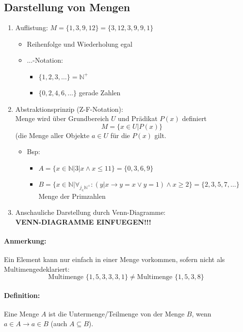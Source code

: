 \subsection{Darstellung von Mengen}
\begin{enumerate}
\item Auflistung: $M=\{1,3,9,12\}=\{3,12,3,9,9,1\}$
\begin{itemize}
\item Reihenfolge und Wiederholung egal
\item \glq $\ldots$\grq -Notation:
\begin{itemize}
\item $\{1,2,3,\ldots\}=\mathbb{N}^+$
\item $\{0,2,4,6,\ldots\}$ gerade Zahlen
\end{itemize}
\end{itemize}
\item Abstraktionsprinzip (Z-F-Notation):\\
Menge wird über Grundbereich $U$ und Prädikat $P(x)$ definiert
\[
M=\{x\in U | P(x)\}
\]
(die Menge aller Objekte $a\in U$ für die $P(x)$ gilt.
\begin{itemize}
\item Bsp:
\begin{itemize}
\item $A=\{x\in\mathbb{N}|3|x \land x\leq 11\} = \{0,3,6,9\}$
\item $B=\{x\in\mathbb{N}|\forall_{j_\in\mathbb{N}^+}:(y|x\rightarrow y=x \lor y=1)\land x\geq 2\}=\{2,3,5,7,\ldots \}$ Menge der Primzahlen
\end{itemize}
\end{itemize}
\item Anschauliche Darstellung durch Venn-Diagramme:\\
\textbf{VENN-DIAGRAMME EINFUEGEN!!!}
\end{enumerate}

\paragraph{Anmerkung:} Ein Element kann nur einfach in einer Menge vorkommen, sofern nicht als \glqq Multimenge\grqq deklariert:
\[
\text{Multimenge }\{1,5,3,3,3,1\} \neq \text{Multimenge }\{1,5,3,8\}
\]
\paragraph{Definition:}Eine Menge $A$ ist die Untermenge/Teilmenge von der Menge $B$, wenn $a\in A\rightarrow a\in B$ (auch $A\subseteq B$).\\

